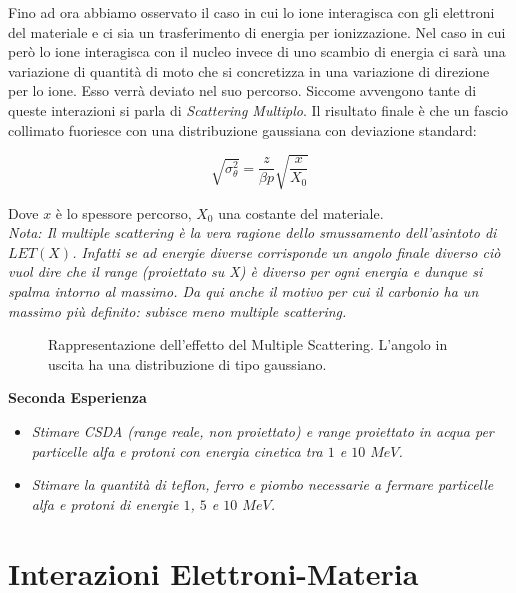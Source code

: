 \documentclass [a4paper, twoside] {book}
\begin{document}
Fino ad ora abbiamo osservato il caso in cui lo ione interagisca con gli elettroni del materiale e ci sia un trasferimento di energia per ionizzazione.
Nel caso in cui però lo ione interagisca con il nucleo invece di uno scambio di energia ci sarà una variazione di quantità di moto che si concretizza in una variazione di direzione per lo ione. Esso verrà deviato nel suo percorso. Siccome avvengono tante di queste interazioni si parla di \emph{Scattering Multiplo}. 
Il risultato finale è che un fascio collimato fuoriesce con una distribuzione gaussiana con deviazione standard:

\begin{equation}
\sqrt{\sigma_{\theta}^2}=\frac{z}{\beta p}\sqrt{\frac{x}{X_0}}
\end{equation}

Dove $x$ è lo spessore percorso, $X_0$ una costante del materiale.\\

\emph{Nota: Il multiple scattering è la vera ragione dello smussamento dell'asintoto di $LET(X)$. Infatti se ad energie diverse corrisponde un angolo finale diverso ciò vuol dire che il range (proiettato su X) è diverso per ogni energia e dunque si spalma intorno al massimo. Da qui anche il motivo per cui il carbonio ha un massimo più definito: subisce meno multiple scattering.}\\

\begin{figure}
\centering
	\caption{Rappresentazione dell'effetto del Multiple Scattering. L'angolo in uscita ha una distribuzione di tipo gaussiano.}
	\label{multiplescattering}
\end{figure}

\textbf{Seconda Esperienza}\\

\begin{itemize}
\item \emph{Stimare CSDA (range reale, non proiettato) e range proiettato in acqua per particelle alfa e protoni con energia cinetica tra $1$ e $10$ $MeV$.}
\item \emph{Stimare la quantità di teflon, ferro e piombo necessarie a fermare particelle alfa e protoni di energie $1$, $5$ e $10$ $MeV$.}
\end{itemize}

\section{Interazioni Elettroni-Materia}
\end{document}
